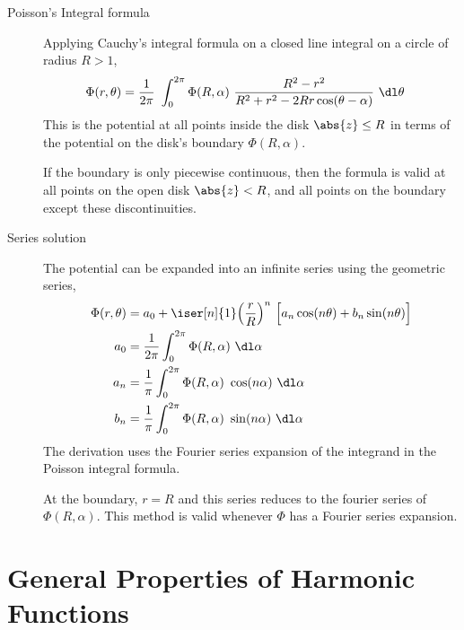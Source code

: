 \begin{description}
    \item[Poisson's Integral formula] Applying Cauchy's integral formula on a closed
        line integral on a circle of radius $ R > 1 $,
        \begin{align}
            \Phi(r, \theta) & = \frac{1}{2\pi}\ \int_{0}^{2\pi} \Phi(R, \alpha)
            \ \frac{R^2 - r^2}{R^2 + r^2 - 2Rr\cos(\theta - \alpha)}\ \dl \theta
        \end{align}
        This is the potential at all points inside the disk $ \abs{z} \leq R $ in terms
        of the potential on the disk's boundary $ \Phi(R, \alpha) $. \par
        If the boundary is only piecewise continuous, then the formula is valid at all
        points on the open disk $ \abs{z} < R $, and all points on the boundary except
        these discontinuities.

    \item[Series solution] The potential can be expanded into an infinite series using
        the geometric series,
        \begin{align}
            \Phi(r, \theta) & = a_0 + \iser[n]{1} \Big( \frac{r}{R} \Big)^n\
            \Big[ a_n \cos(n\theta) + b_n \sin(n\theta) \Big]                  \\
            a_0             & = \frac{1}{2\pi} \int_{0}^{2\pi} \Phi(R, \alpha)
            \ \dl \alpha                                                       \\
            a_n             & = \frac{1}{\pi} \int_{0}^{2\pi} \Phi(R, \alpha)
            \ \cos(n\alpha)\ \dl \alpha                                        \\
            b_n             & = \frac{1}{\pi} \int_{0}^{2\pi} \Phi(R, \alpha)
            \ \sin(n\alpha)\ \dl \alpha
        \end{align}
        The derivation uses the Fourier series expansion of the integrand in the Poisson
        integral formula. \par
        At the boundary, $ r = R $ and this series reduces to the fourier series of
        $ \Phi(R, \alpha) $. This method is valid whenever $ \Phi $ has a Fourier series
        expansion.
\end{description}

\section{General Properties of Harmonic Functions}

